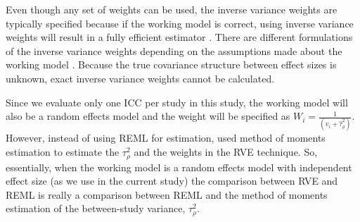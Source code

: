 


Even though any set of weights can be used, the inverse variance weights are typically specified because if the working model is correct, using inverse variance weights will result in a fully efficient estimator \cite{hedges2010}. There are different formulations of the inverse variance weights depending on the assumptions made about the working model \cite{hedges2010}. Because the true covariance structure between effect sizes is unknown, exact inverse variance weights cannot be calculated. 

Since we evaluate only one ICC per study in this study, the working model will also be a random effects model and the weight will be specified as $W_i=\frac{1}{(\hat{v}_i+\hat{\tau}_\rho^2)}$. However, instead of using REML for estimation,   used method of moments estimation to estimate the $\tau_{\rho}^2$ and the weights in the RVE technique. So, essentially, when the working model is a random effects model with independent effect size (as we use in the current study) the comparison between RVE and REML is really a comparison between REML and the method of moments estimation of the between-study variance, $\tau_\rho^2$.


